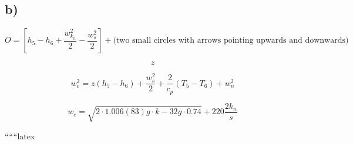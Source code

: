 

\subsection*{b)}

\[
O = \left[ h_5 - h_6 + \frac{w_{k_n}^2}{2} - \frac{w_{s}^2}{2} \right] + \text{(two small circles with arrows pointing upwards and downwards)}
\]

\[
z
\]

\[
w_{c}^2 = z \left( h_5 - h_6 \right) + \frac{w_{s}^2}{2} + \frac{2}{c_{p}} \left( T_5 - T_6 \right) + w_{n}^2
\]

\[
w_{c} = \sqrt{2 \cdot 1.006 \left( 83 \right) g \cdot k - 32 g \cdot 0.74} + 220 \frac{2 k_n}{s}
\]

``````latex